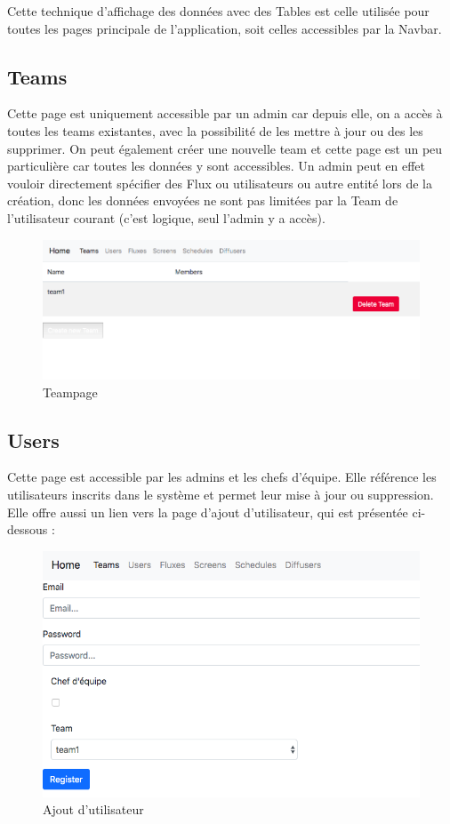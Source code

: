 \documentclass[french]{article}
\begin{document}
Cette technique d'affichage des données avec des Tables est celle utilisée pour toutes les pages principale de l'application, soit celles accessibles par la Navbar.

\subsection{Teams}

Cette page est uniquement accessible par un admin car depuis elle, on a accès à toutes les teams existantes, avec la possibilité de les mettre à jour ou des les supprimer. On peut également  créer une nouvelle team et cette page est un peu particulière car toutes les données y sont accessibles. Un admin peut en effet vouloir directement spécifier des Flux ou utilisateurs ou autre entité lors de la création, donc les données envoyées ne sont pas limitées par la Team de l'utilisateur courant (c'est logique, seul l'admin y a accès). 

\begin{figure}[h]
	\centering	
	\includegraphics[width=0.8\linewidth]{interface/teampage.png}%
	\caption{Teampage}
\end{figure} 

\newpage
\subsection{Users}

Cette page est accessible par les admins et les chefs d'équipe. Elle référence les utilisateurs inscrits dans le système et permet leur mise à jour ou suppression. Elle offre aussi un lien vers la page d'ajout d'utilisateur, qui est présentée ci-dessous :

\begin{figure}[h]
	\centering	
	\includegraphics[width=0.8\linewidth]{interface/userpage_register.png}%
	\caption{Ajout d'utilisateur}
\end{figure} 
\end{document}
